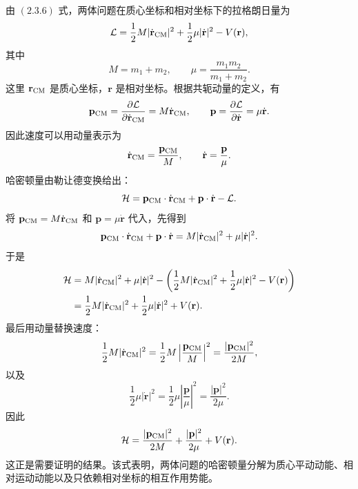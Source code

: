 \begin{solution}[两体问题的哈密顿量]
\answer
由 \((2.3.6)\) 式，两体问题在质心坐标和相对坐标下的拉格朗日量为
\[
\mathcal L
=
\frac{1}{2}M|\dot{\mathbf r}_{\rm CM}|^2
+
\frac{1}{2}\mu|\dot{\mathbf r}|^2
-
V(\mathbf r),
\]
其中
\[
M=m_1+m_2,\qquad
\mu=\frac{m_1m_2}{m_1+m_2}.
\]
这里 \(\mathbf r_{\rm CM}\) 是质心坐标，\(\mathbf r\) 是相对坐标。根据共轭动量的定义，有
\[
\mathbf p_{\rm CM}
=
\frac{\partial \mathcal L}{\partial \dot{\mathbf r}_{\rm CM}}
=
M\dot{\mathbf r}_{\rm CM},
\qquad
\mathbf p
=
\frac{\partial \mathcal L}{\partial \dot{\mathbf r}}
=
\mu\dot{\mathbf r}.
\]
因此速度可以用动量表示为
\[
\dot{\mathbf r}_{\rm CM}=\frac{\mathbf p_{\rm CM}}{M},
\qquad
\dot{\mathbf r}=\frac{\mathbf p}{\mu}.
\]
哈密顿量由勒让德变换给出：
\[
\mathcal H
=
\mathbf p_{\rm CM}\cdot \dot{\mathbf r}_{\rm CM}
+
\mathbf p\cdot \dot{\mathbf r}
-
\mathcal L.
\]
将 \(\mathbf p_{\rm CM}=M\dot{\mathbf r}_{\rm CM}\) 和 \(\mathbf p=\mu\dot{\mathbf r}\) 代入，先得到
\[
\mathbf p_{\rm CM}\cdot \dot{\mathbf r}_{\rm CM}
+
\mathbf p\cdot \dot{\mathbf r}
=
M|\dot{\mathbf r}_{\rm CM}|^2+\mu|\dot{\mathbf r}|^2.
\]
于是
\[
\begin{aligned}
\mathcal H
&=
M|\dot{\mathbf r}_{\rm CM}|^2+\mu|\dot{\mathbf r}|^2
-\left(
\frac{1}{2}M|\dot{\mathbf r}_{\rm CM}|^2
+
\frac{1}{2}\mu|\dot{\mathbf r}|^2
-
V(\mathbf r)
\right)\\
&=
\frac{1}{2}M|\dot{\mathbf r}_{\rm CM}|^2
+
\frac{1}{2}\mu|\dot{\mathbf r}|^2
+
V(\mathbf r).
\end{aligned}
\]
最后用动量替换速度：
\[
\frac{1}{2}M|\dot{\mathbf r}_{\rm CM}|^2
=
\frac{1}{2}M\left|\frac{\mathbf p_{\rm CM}}{M}\right|^2
=
\frac{|\mathbf p_{\rm CM}|^2}{2M},
\]
以及
\[
\frac{1}{2}\mu|\dot{\mathbf r}|^2
=
\frac{1}{2}\mu\left|\frac{\mathbf p}{\mu}\right|^2
=
\frac{|\mathbf p|^2}{2\mu}.
\]
因此
\[
\mathcal H
=
\frac{|\mathbf p_{\rm CM}|^2}{2M}
+
\frac{|\mathbf p|^2}{2\mu}
+
V(\mathbf r).
\]
这正是需要证明的结果。该式表明，两体问题的哈密顿量分解为质心平动动能、相对运动动能以及只依赖相对坐标的相互作用势能。
\end{solution}